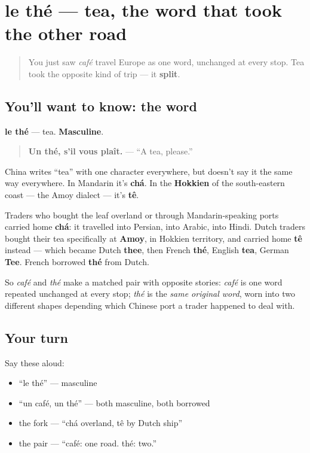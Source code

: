 \section[le thé]{le thé — tea, the word that took the other road}

\label{lesson:FR-C28-the}



\begin{quote}
You just saw \emph{café} travel Europe as one word, unchanged at every stop. Tea took the opposite kind of trip — it \textbf{split}.
\end{quote}

\subsection*{You'll want to know: the word}
\textbf{le thé} — tea. \textbf{Masculine}.

\begin{quote}
\textbf{Un thé, s'il vous plaît.} — \textquotedblleft{}A tea, please.\textquotedblright{}
\end{quote}

\begin{cousinweb}
China writes \textquotedblleft{}tea\textquotedblright{} with one character everywhere, but doesn't say it the same way everywhere. In Mandarin it's \textbf{chá}. In the \textbf{Hokkien} of the south-eastern coast — the Amoy dialect — it's \textbf{tê}.

Traders who bought the leaf overland or through Mandarin-speaking ports carried home \textbf{chá}: it travelled into Persian, into Arabic, into Hindi. Dutch traders bought their tea specifically at \textbf{Amoy}, in Hokkien territory, and carried home \textbf{tê} instead — which became Dutch \textbf{thee}, then French \textbf{thé}, English \textbf{tea}, German \textbf{Tee}. French borrowed \textbf{thé} from Dutch.

So \emph{café} and \emph{thé} make a matched pair with opposite stories: \emph{café} is one word repeated unchanged at every stop; \emph{thé} is the \emph{same original word}, worn into two different shapes depending which Chinese port a trader happened to deal with.
\end{cousinweb}

\subsection*{Your turn}
Say these aloud:

\begin{itemize}
\raggedright
  \item \textquotedblleft{}le thé\textquotedblright{} — masculine
  \item \textquotedblleft{}un café, un thé\textquotedblright{} — both masculine, both borrowed
  \item the fork — \textquotedblleft{}chá overland, tê by Dutch ship\textquotedblright{}
  \item the pair — \textquotedblleft{}café: one road. thé: two.\textquotedblright{}
\end{itemize}

